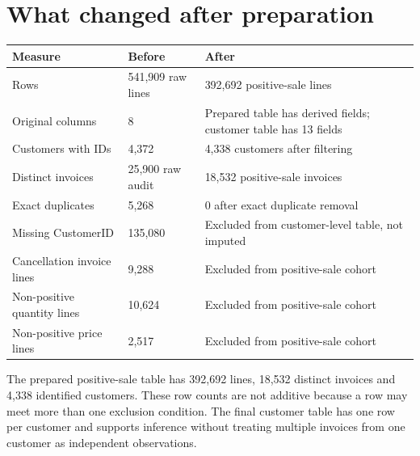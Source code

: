 \documentclass[10pt,a4paper,twocolumn]{article}
\begin{document}
\section{What changed after preparation}
{\footnotesize
\begin{tabularx}{\linewidth}{@{}L{3.3cm} L{2.0cm} Y@{}}
\toprule
\textbf{Measure} & \textbf{Before} & \textbf{After}\\
\midrule
Rows & 541,909 raw lines & 392,692 positive-sale lines\\
Original columns & 8 & Prepared table has derived fields; customer table has 13 fields\\
Customers with IDs & 4,372 & 4,338 customers after filtering\\
Distinct invoices & 25,900 raw audit & 18,532 positive-sale invoices\\
Exact duplicates & 5,268 & 0 after exact duplicate removal\\
Missing CustomerID & 135,080 & Excluded from customer-level table, not imputed\\
Cancellation invoice lines & 9,288 & Excluded from positive-sale cohort\\
Non-positive quantity lines & 10,624 & Excluded from positive-sale cohort\\
Non-positive price lines & 2,517 & Excluded from positive-sale cohort\\
\bottomrule
\end{tabularx}}
The prepared positive-sale table has 392,692 lines, 18,532 distinct invoices and 4,338 identified customers. These row counts are not additive because a row may meet more than one exclusion condition. The final customer table has one row per customer and supports inference without treating multiple invoices from one customer as independent observations.
\end{document}

